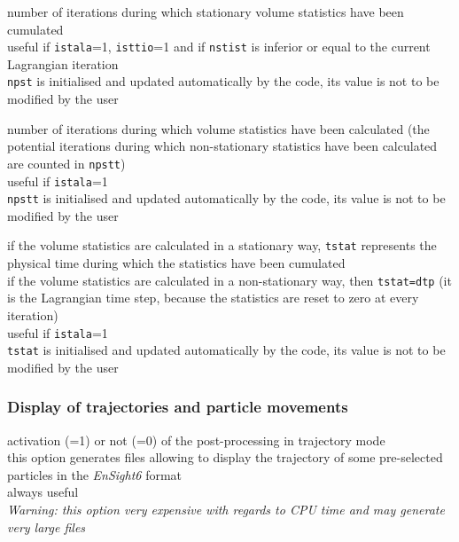 {number of iterations during which stationary volume statistics have
been cumulated\\
useful if \texttt{istala}=1, \texttt{isttio}=1 and if \texttt{nstist} is
inferior or equal to the current Lagrangian iteration\\
\texttt{npst} is initialised and updated automatically by the code, its
value is not to be modified by the user}

{number of iterations during which volume statistics have been
calculated (the potential iterations during which non-stationary
statistics have been calculated are counted in \texttt{npstt})\\
useful if \texttt{istala}=1\\
\texttt{npstt} is initialised and updated automatically by the code,
its value is not to be modified by the user}

{if the volume statistics are calculated in a stationary way, \texttt{tstat}
represents the physical time during which the statistics have been cumulated\\
if the volume statistics are calculated in a non-stationary way,
then \texttt{tstat=dtp} (it is the Lagrangian time step, because the
statistics are reset to zero at every iteration)\\
useful if \texttt{istala}=1\\
\texttt{tstat} is initialised and updated automatically by the code,
its value is not to be modified by the user}

\subsubsection{Display of trajectories and particle movements}

{activation (=1) or not (=0) of the post-processing in trajectory mode\\
this option generates files allowing to display the trajectory of
some pre-selected particles in the \textit{EnSight6} format\\
always useful\\
{\em Warning: this option very expensive with regards to CPU time and may
generate very large files}}

